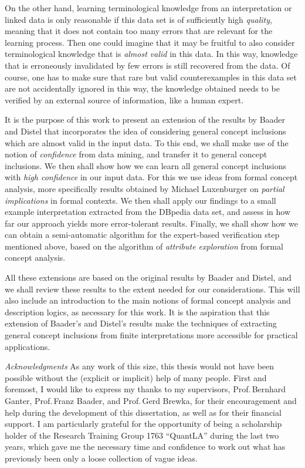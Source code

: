 On the other hand, learning terminological knowledge from an interpretation or linked data
is only reasonable if this data set is of sufficiently high \emph{quality}, meaning that
it does not contain too many errors that are relevant for the learning process.  Then one
could imagine that it may be fruitful to also consider terminological knowledge that is
\emph{almost valid} in this data.  In this way, knowledge that is erroneously invalidated
by few errors is still recovered from the data.  Of course, one has to make sure that rare
but valid counterexamples in this data set are not accidentally ignored in this way, \ie
the knowledge obtained needs to be verified by an external source of information, like a
human expert.

It is the purpose of this work to present an extension of the results by Baader and Distel
that incorporates the idea of considering general concept inclusions which are almost
valid in the input data.  To this end, we shall make use of the notion of
\emph{confidence} from data mining, and transfer it to general concept inclusions.  We
then shall show how we can learn all general concept inclusions with \emph{high
  confidence} in our input data.  For this we use ideas from formal concept analysis, more
specifically results obtained by Michael Luxenburger on \emph{partial implications} in
formal contexts.  We then shall apply our findings to a small example interpretation
extracted from the DBpedia data set, and assess in how far our approach yields more
error-tolerant results.  Finally, we shall show how we can obtain a semi-automatic
algorithm for the expert-based verification step mentioned above, based on the algorithm
of \emph{attribute exploration} from formal concept analysis.

All these extensions are based on the original results by Baader and Distel, and we shall
review these results to the extent needed for our considerations.  This will also include
an introduction to the main notions of formal concept analysis and description logics, as
necessary for this work.  It is the aspiration that this extension of Baader's and
Distel's results make the techniques of extracting general concept inclusions from finite
interpretations more accessible for practical applications.

\bigskip\noindent%
\textit{Acknowledgments}\hspace*{1em} As any work of this size, this thesis would not have
been possible without the (explicit or implicit) help of many people.  First and foremost,
I would like to express my thanks to my supervisors, Prof.\,Bernhard Ganter, Prof.\,Franz
Baader, and Prof.\,Gerd Brewka, for their encouragement and help during the development of
this dissertation, as well as for their financial support.  I am particularly grateful for
the opportunity of being a scholarship holder of the Research Training Group 1763
\enquote{QuantLA} during the last two years, which gave me the necessary time and
confidence to work out what has previously been only a loose collection of vague ideas.

